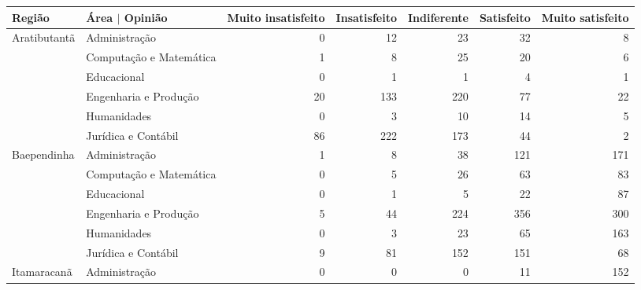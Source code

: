 \begin{table}[ht]
\centering
\begin{tabular}{ll rrrrr}
  \toprule
 Região        & Área $\vert$ Opinião   & \multicolumn{1}{l}{ Muito insatisfeito} & \multicolumn{1}{l}{ Insatisfeito} & \multicolumn{1}{l}{ Indiferente} & \multicolumn{1}{l}{ Satisfeito} & \multicolumn{1}{l}{ Muito satisfeito} \\ 
   \midrule
Aratibutantã  & Administração           &                  0 &           12 &          23 &         32 &                8 \\ 
                & Computação e Matemática &                  1 &            8 &          25 &         20 &                6 \\ 
                & Educacional             &                  0 &            1 &           1 &          4 &                1 \\ 
                & Engenharia e Produção   &                 20 &          133 &         220 &         77 &               22 \\ 
                & Humanidades             &                  0 &            3 &          10 &         14 &                5 \\ 
                & Jurídica e Contábil     &                 86 &          222 &         173 &         44 &                2 \\ 
  Baependinha   & Administração           &                  1 &            8 &          38 &        121 &              171 \\ 
                & Computação e Matemática &                  0 &            5 &          26 &         63 &               83 \\ 
                & Educacional             &                  0 &            1 &           5 &         22 &               87 \\ 
                & Engenharia e Produção   &                  5 &           44 &         224 &        356 &              300 \\ 
                & Humanidades             &                  0 &            3 &          23 &         65 &              163 \\ 
                & Jurídica e Contábil     &                  9 &           81 &         152 &        151 &               68 \\ 
  Itamaracanã   & Administração           &                  0 &            0 &           0 &         11 &              152 \\ 

\end{tabular}
\end{table}
